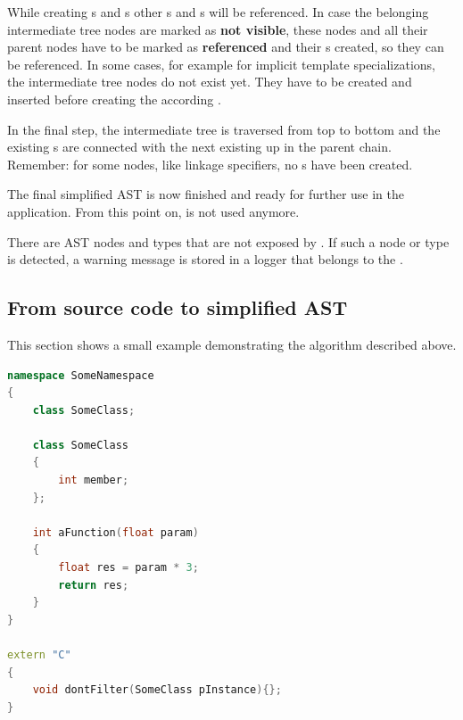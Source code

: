 While creating s and s other s and s will be referenced. In case the belonging intermediate tree nodes are marked as \textbf{not visible}, these nodes and all their parent nodes have to be marked as \textbf{referenced} and their s created, so they can be referenced. In some cases, for example for implicit template specializations, the intermediate tree nodes do not exist yet. They have to be created and inserted before creating the according .

In the final step, the intermediate tree is traversed from top to bottom and the existing s are connected with the next existing  up in the parent chain. Remember: for some nodes, like linkage specifiers, no s have been created.

The final simplified AST is now finished and ready for further use in the application. From this point on,  is not used anymore.

There are AST nodes and types that are not exposed by . If such a node or type is detected, a warning message is stored in a logger that belongs to the .

\newpage
\subsection{From source code to simplified AST}

This section shows a small example demonstrating the algorithm described above.

\SingleSpacing
\begin{lstlisting}[language=C++, caption=Example input code for \myProperName{CPPAnalyzer}]
namespace SomeNamespace
{
	class SomeClass;
	
	class SomeClass
	{
		int member;
	};
	
	int aFunction(float param)
	{
		float res = param * 3;
		return res;
	}
}

extern "C"
{
	void dontFilter(SomeClass pInstance){};
}
\end{lstlisting}
\OnehalfSpacing

